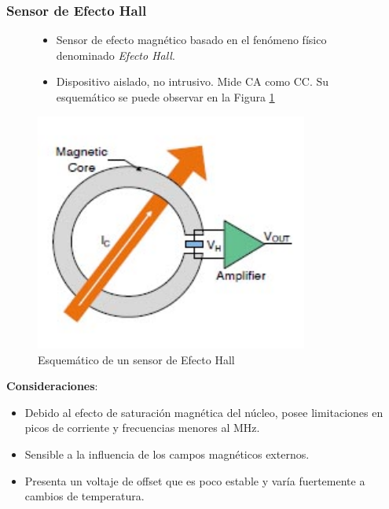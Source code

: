 \documentclass[10pt]{beamer}
\theoremstyle{remark}
\theoremstyle{definition}
\begin{document}
\begin{frame}[allowframebreaks]
  \frametitle{Sensor de Efecto Hall}
  \begin{figure}[h!]
	\begin{minipage}{0.45\textwidth}
	  \begin{itemize}
		\item Sensor de efecto magnético basado en el fenómeno físico denominado
		  \emph{Efecto Hall}.
		\item Dispositivo aislado, no intrusivo. Mide CA como CC. Su esquemático
		  se puede observar en la Figura \ref{sch_hall}
	  \end{itemize}
	\end{minipage}
	\hspace{10pt}
	\begin{minipage}{0.45\textwidth}
	  \centering
	  \includegraphics[width=0.8\textwidth]{./images/Open-loop_Hall_Sensor.jpg}
	  \caption{Esquemático de un sensor de Efecto Hall}
	  \label{sch_hall}
	\end{minipage}
  \end{figure}

  \textbf{Consideraciones}:
  \begin{itemize}
	\item Debido al efecto de saturación magnética del núcleo, posee
	  limitaciones en picos de corriente y frecuencias menores al MHz.
	\item Sensible a la influencia de los campos magnéticos externos.
	\item Presenta un voltaje de offset que es poco estable y varía
	  fuertemente a cambios de temperatura.
  \end{itemize}
\end{frame}
\end{document}
